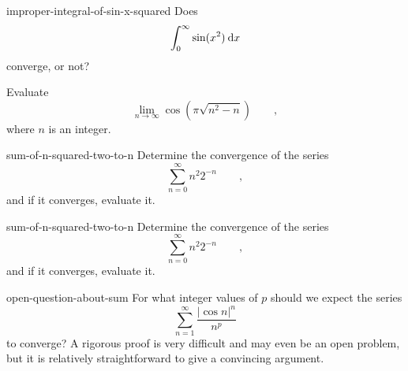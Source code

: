 \begin{hwsection}
\begin{hwwithsoln}[2]{improper-integral-of-sin-x-squared}
Does
\begin{equation*}
  \int_0^\infty \sin (x^2)\:\textup{d} x
\end{equation*}
converge, or not?
\end{hwwithsoln}

\begin{hw}[2]
Evaluate
\begin{equation*}
  \lim_{n\rightarrow\infty} \cos(\pi\sqrt{n^2-n}) \qquad ,
\end{equation*}
where $n$ is an integer.
\end{hw}

\begin{hwwithsoln}[2]{sum-of-n-squared-two-to-n}
Determine the convergence of the series
\begin{equation*}
  \sum_{n=0}^{\infty} n^2 2^{-n} \qquad ,
\end{equation*}
and if it converges, evaluate it.
\end{hwwithsoln}

\begin{hwwithsoln}[2]{sum-of-n-squared-two-to-n}
Determine the convergence of the series
\begin{equation*}
  \sum_{n=0}^{\infty} n^2 2^{-n} \qquad ,
\end{equation*}
and if it converges, evaluate it.
\end{hwwithsoln}

\begin{hwwithsoln}[2]{open-question-about-sum}
For what integer values of $p$ should we expect the series
\begin{equation*}
  \sum_{n=1}^{\infty} \frac{|\cos n|^n}{n^p}
\end{equation*}
to converge? A rigorous proof is very difficult and
may even be an open problem, but it is relatively straightforward to
give a convincing argument.
\end{hwwithsoln}

\end{hwsection}

